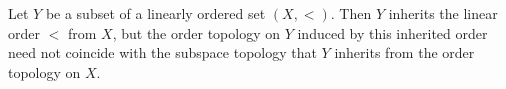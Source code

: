 Let $Y$ be a subset of a linearly ordered set $(X, <)$. Then $Y$ inherits the linear order $<$ from $X$, but the order topology on $Y$ induced by this inherited order need not coincide with the subspace topology that $Y$ inherits from the order topology on $X$.
